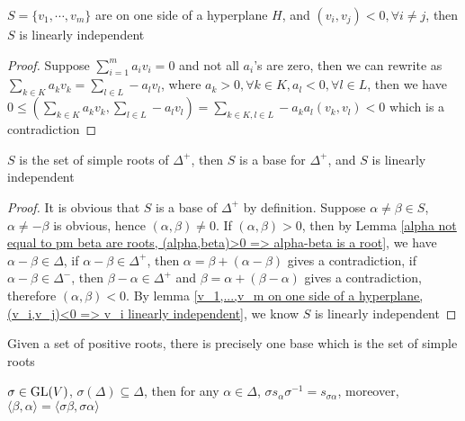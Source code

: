 \documentclass[main]{subfiles}
\begin{document}
\begin{lemma}\label{v_1,...,v_m on one side of a hyperplane, (v_i,v_j)<0 => v_i linearly independent}
$S=\{v_1,\cdots,v_m\}$ are on one side of a hyperplane $H$, and $(v_i,v_j)<0,\forall i\neq j$, then $S$ is linearly independent
\end{lemma}

\begin{proof}
Suppose $\displaystyle\sum_{i=1}^ma_iv_i=0$ and not all $a_i$'s are zero, then we can rewrite as $\displaystyle\sum_{k\in K}a_kv_k=\sum_{l\in L}-a_lv_l$, where $a_k>0,\forall k\in K,a_l<0,\forall l\in L$, then we have $\displaystyle0\leq\left(\sum_{k\in K}a_kv_k,\sum_{l\in L}-a_lv_l\right)=\sum_{k\in K,l\in L}-a_ka_l(v_k,v_l)<0$ which is a contradiction
\end{proof}

\begin{lemma}
$S$ is the set of simple roots of $\Delta^+$, then $S$ is a base for $\Delta^+$, and $S$ is linearly independent
\end{lemma}

\begin{proof}
It is obvious that $S$ is a base of $\Delta^+$ by definition. Suppose $\alpha\neq\beta\in S$, $\alpha\neq-\beta$ is obvious, hence $(\alpha,\beta)\neq0$. If $(\alpha,\beta)>0$, then by Lemma \ref{alpha not equal to pm beta are roots, (alpha,beta)>0 => alpha-beta is a root}, we have $\alpha-\beta\in\Delta$, if $\alpha-\beta\in\Delta^+$, then $\alpha=\beta+(\alpha-\beta)$ gives a contradiction, if $\alpha-\beta\in\Delta^-$, then $\beta-\alpha\in\Delta^+$ and $\beta=\alpha+(\beta-\alpha)$ gives a contradiction, therefore $(\alpha,\beta)<0$. By lemma \ref{v_1,...,v_m on one side of a hyperplane, (v_i,v_j)<0 => v_i linearly independent}, we know $S$ is linearly independent
\end{proof}

\begin{remark}
Given a set of positive roots, there is precisely one base which is the set of simple roots
\end{remark}

\begin{lemma}\label{Conjugacy of roots and Weyl group}
$\sigma\in\operatorname{GL}(V)$, $\sigma(\Delta)\subseteq\Delta$, then for any $\alpha\in \Delta$, $\sigma s_{\alpha}\sigma^{-1}=s_{\sigma\alpha}$, moreover, $\langle\beta,\alpha\rangle=\langle\sigma\beta,\sigma\alpha\rangle$
\end{lemma}
\end{document}
